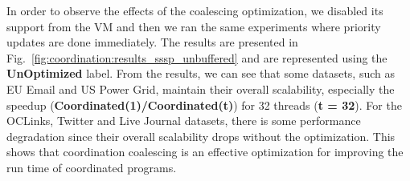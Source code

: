 In order to observe the effects of the coalescing optimization, we disabled its
support from the VM and then we ran the same experiments where priority updates
are done immediately. The results are presented in
Fig.~\ref{fig:coordination:results_sssp_unbuffered} and are represented using
the \textbf{UnOptimized} label. From the results, we can see that some datasets,
such as EU Email and US Power Grid, maintain their overall scalability,
especially the speedup (\textbf{Coordinated(1)/Coordinated(t)}) for 32 threads
(\textbf{t = 32}). For the OCLinks, Twitter and Live Journal datasets, there is
some performance degradation since their overall scalability drops without the
optimization. This shows that coordination coalescing is an effective
optimization for improving the run time of coordinated programs.



